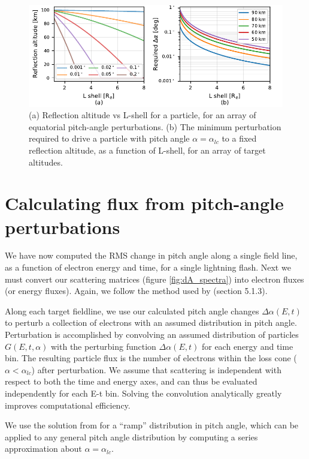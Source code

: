 \begin{figure}[h]
\begin{center}
\includegraphics{figures/pitch_angle_vs_depth.pdf}
\caption{(a) Reflection altitude vs L-shell for a particle, for an array of equatorial pitch-angle perturbations. (b) The minimum perturbation required to drive a particle with pitch angle $\alpha = \alpha_{lc}$ to a fixed reflection altitude, as a function of L-shell, for an array of target altitudes.}
\label{fig:pitch_angle_vs_altitude}
\end{center}
\end{figure}


\section{Calculating flux from pitch-angle perturbations}
\label{section:flux_from_pitch_angle}
We have now computed the RMS change in pitch angle along a single field line, as a function of electron energy and time, for a single lightning flash. Next we must convert our scattering matrices (figure \ref{fig:dA_spectra}) into electron fluxes (or energy fluxes). Again, we follow the method used by \cite{Bortnik2005} (section 5.1.3).

Along each target fieldline, we use our calculated pitch angle changes $\Delta \alpha(E,t)$ to perturb a collection of electrons with an assumed distribution in pitch angle. Perturbation is accomplished by convolving an assumed distribution of particles $G(E,t,\alpha)$ with the perturbing function $\Delta \alpha(E,t)$ for each energy and time bin. The resulting particle flux is the number of electrons within the loss cone ($\alpha < \alpha_{lc}$) after perturbation. We assume that scattering is independent with respect to both the time and energy axes, and can thus be evaluated independently for each E-t bin. Solving the convolution analytically greatly improves computational efficiency.

We use the solution from \cite{Bortnik2005} for a ``ramp'' distribution in pitch angle, which can be applied to any general pitch angle distribution by computing a series approximation about $\alpha = \alpha_{lc}$.


